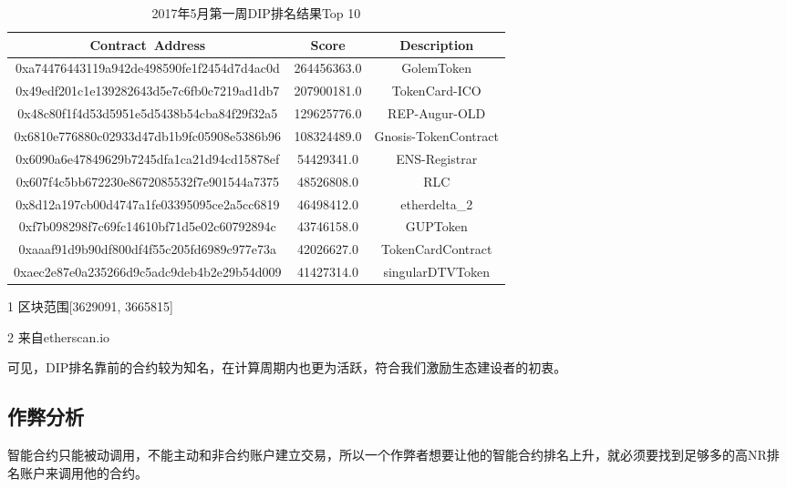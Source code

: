 \begin{table}[h]
\centering
\begin{threeparttable}[b]
\caption{2017年5月第一周DIP排名结果Top 10}
\label{table:dip}
\begin{tabular}{ccc} \toprule
    {Contract~Address} & {Score} & {Description\tnote{2}} \\ \midrule
0xa74476443119a942de498590fe1f2454d7d4ac0d & 264456363.0 & GolemToken \\
0x49edf201c1e139282643d5e7c6fb0c7219ad1db7 & 207900181.0 & TokenCard-ICO \\
0x48c80f1f4d53d5951e5d5438b54cba84f29f32a5 & 129625776.0 & REP-Augur-OLD \\
0x6810e776880c02933d47db1b9fc05908e5386b96 & 108324489.0 & Gnosis-TokenContract \\
0x6090a6e47849629b7245dfa1ca21d94cd15878ef & 54429341.0 & ENS-Registrar \\
0x607f4c5bb672230e8672085532f7e901544a7375 & 48526808.0 & RLC \\
0x8d12a197cb00d4747a1fe03395095ce2a5cc6819 & 46498412.0 & etherdelta\_2 \\
0xf7b098298f7c69fc14610bf71d5e02c60792894c & 43746158.0 & GUPToken \\
0xaaaf91d9b90df800df4f55c205fd6989c977e73a & 42026627.0 & TokenCardContract \\
0xaec2e87e0a235266d9c5adc9deb4b2e29b54d009 & 41427314.0 & singularDTVToken \\
\bottomrule                                                     
\end{tabular}	
\begin{tablenotes}
  \small
  \item[1] 区块范围[3629091, 3665815]
  \item[2] 来自etherscan.io
\end{tablenotes}
\end{threeparttable}
\end{table}

可见，DIP排名靠前的合约较为知名，在计算周期内也更为活跃，符合我们激励生态建设者的初衷。

\subsection{作弊分析}
\label{dip:sybil}

智能合约只能被动调用，不能主动和非合约账户建立交易，所以一个作弊者想要让他的智能合约排名上升，就必须要找到足够多的高NR排名账户来调用他的合约。

